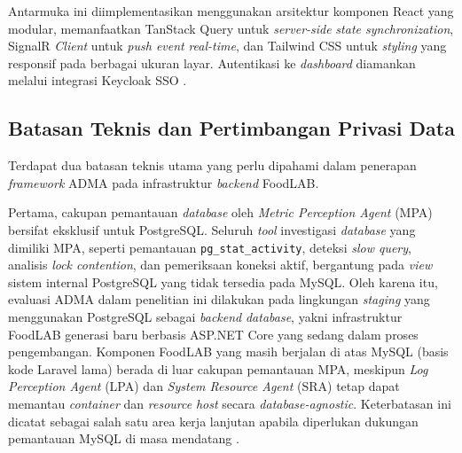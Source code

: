 Antarmuka ini diimplementasikan menggunakan arsitektur komponen React yang modular, memanfaatkan TanStack Query untuk \textit{server-side} \textit{state synchronization}, SignalR \textit{Client} untuk \textit{push event} \textit{real-time}, dan Tailwind CSS untuk \textit{styling} yang responsif pada berbagai ukuran layar. Autentikasi ke \textit{dashboard} diamankan melalui integrasi Keycloak SSO \cite{chatterjee2022keycloak}.

\subsection{Batasan Teknis dan Pertimbangan Privasi Data}

Terdapat dua batasan teknis utama yang perlu dipahami dalam penerapan \textit{framework} ADMA pada infrastruktur \textit{backend} FoodLAB.

Pertama, cakupan pemantauan \textit{database} oleh \textit{Metric Perception Agent} (MPA) bersifat eksklusif untuk PostgreSQL. Seluruh \textit{tool} investigasi \textit{database} yang dimiliki MPA, seperti pemantauan \texttt{pg\_stat\_activity}, deteksi \textit{slow query}, analisis \textit{lock contention}, dan pemeriksaan koneksi aktif, bergantung pada \textit{view} sistem internal PostgreSQL yang tidak tersedia pada MySQL. Oleh karena itu, evaluasi ADMA dalam penelitian ini dilakukan pada lingkungan \textit{staging} yang menggunakan PostgreSQL sebagai \textit{backend} \textit{database}, yakni infrastruktur FoodLAB generasi baru berbasis ASP.NET Core yang sedang dalam proses pengembangan. Komponen FoodLAB yang masih berjalan di atas MySQL (basis kode Laravel lama) berada di luar cakupan pemantauan MPA, meskipun \textit{Log Perception Agent} (LPA) dan \textit{System Resource Agent} (SRA) tetap dapat memantau \textit{container} dan \textit{resource} \textit{host} secara \textit{database-agnostic}. Keterbatasan ini dicatat sebagai salah satu area kerja lanjutan apabila diperlukan dukungan pemantauan MySQL di masa mendatang \cite{salunke2024performance}.

